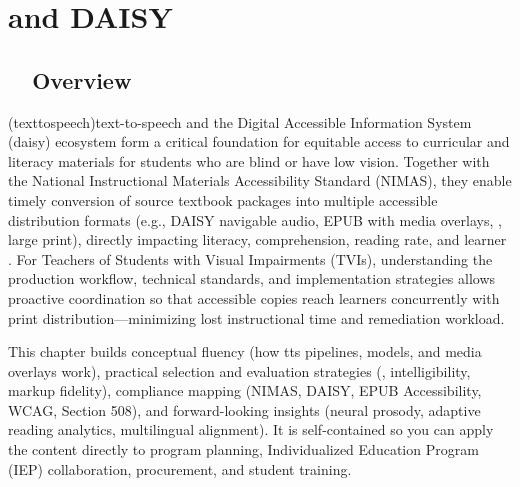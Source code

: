\chapter{ and DAISY}\label{ch7:chap:text-to-speech-daisy}
\raggedright


\section{~~Overview}\label{ch07:sec:overview}
 (\gls{texttospeech})text-to-speech and the Digital Accessible Information System
(\gls{daisy}) ecosystem form a critical foundation for equitable 
access to curricular and literacy materials for students who are blind or have low vision. Together with
the National Instructional Materials Accessibility Standard (NIMAS), they enable timely
conversion of source textbook packages into multiple accessible distribution formats (e.g., DAISY
navigable audio, EPUB with media overlays, , large print), directly impacting
literacy, comprehension, reading rate, and learner . For Teachers of Students with
Visual Impairments (TVIs), understanding the production workflow, technical standards, and implementation
strategies allows proactive coordination so that accessible copies reach learners concurrently with print
distribution—minimizing lost instructional time and remediation workload.

This chapter builds conceptual fluency (how \gls{tts} pipelines,  models, and media overlays work),
practical selection and evaluation strategies (, intelligibility, markup fidelity), compliance
mapping (NIMAS, DAISY, EPUB Accessibility, WCAG, Section 508), and forward-looking insights (neural
prosody, adaptive reading analytics, multilingual alignment). It is self-contained so you can apply the
content directly to program planning, Individualized Education Program (IEP) collaboration, procurement,
and student training.

